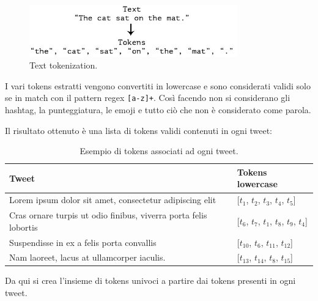 \documentclass[oneside]{book}
\begin{document}
\begin{figure}[!h]
	\centering
	\includegraphics[width=9cm]{assets/text-to-tokens.jpg}
	\caption{Text tokenization.}
	\label{fig:tokenization}
\end{figure}


\pagebreak

I vari tokens estratti vengono convertiti in lowercase e sono considerati validi solo se in match con il pattern regex \texttt{[a-z]+}. Così facendo non si considerano gli hashtag, la punteggiatura, le emoji e tutto ciò che non è considerato come parola.

Il risultato ottenuto è una lista di tokens validi contenuti in ogni tweet:

\begin{table}[h!]
	\centering
	\begin{tabular}[t]{l|l}
		\hline
		\textbf{Tweet} & \textbf{Tokens lowercase}\\
		\hline
		Lorem ipsum dolor sit amet, consectetur adipiscing elit				& [$t_1$, $t_2$, $t_3$, $t_4$, $t_5$] \\
		Cras ornare turpis ut odio finibus, viverra porta felis lobortis 	& [$t_6$, $t_7$, $t_1$, $t_8$, $t_9$, $t_4$] \\
		Suspendisse in ex a felis porta convallis							& [$t_{10}$, $t_6$, $t_{11}$, $t_{12}$] \\
		Nam laoreet, lacus at ullamcorper iaculis.							& [$t_{13}$, $t_{14}$, $t_8$, $t_{15}$]\\
		
		\hline
	\end{tabular}
	\caption{Esempio di tokens associati ad ogni tweet.}
\end{table}
\noindent
Da qui si crea l'insieme di tokens univoci a partire dai tokens presenti in ogni tweet.
\end{document}
